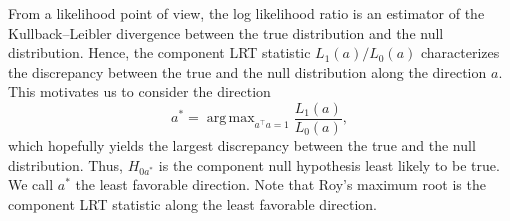 \documentclass[12pt]{article} %
\DeclareMathOperator*{\argmax}{arg\,max}
\newcommand{\bH}{\mathbf{H}}
\newcommand{\bG}{\mathbf{G}}
\theoremstyle{definition}
\begin{document}
%

From a likelihood point of view, the log likelihood ratio is an estimator of the Kullback--Leibler divergence between the true distribution and the null distribution.
Hence, the component LRT statistic $L_1(a)/L_0(a)$ characterizes the discrepancy between  the true and the null distribution along the direction $a$.
This motivates us to consider the direction 
\begin{equation}\label{LFDdef1}
    a^*=\argmax_{a^\top a=1}\frac{L_1(a)}{L_0(a)},
\end{equation}
which hopefully yields the largest discrepancy between the true and the null distribution.
Thus, $H_{0a^*}$ is the component null hypothesis least likely to be true.
We call $a^*$ the least favorable direction. %
Note that Roy's maximum root is the component LRT statistic along the least favorable direction.




\end{document}
